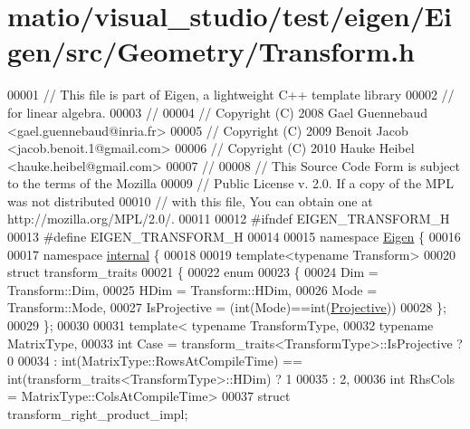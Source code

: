 \hypertarget{matio_2visual__studio_2test_2eigen_2_eigen_2src_2_geometry_2_transform_8h_source}{}\section{matio/visual\+\_\+studio/test/eigen/\+Eigen/src/\+Geometry/\+Transform.h}
\label{matio_2visual__studio_2test_2eigen_2_eigen_2src_2_geometry_2_transform_8h_source}

\begin{DoxyCode}
00001 \textcolor{comment}{// This file is part of Eigen, a lightweight C++ template library}
00002 \textcolor{comment}{// for linear algebra.}
00003 \textcolor{comment}{//}
00004 \textcolor{comment}{// Copyright (C) 2008 Gael Guennebaud <gael.guennebaud@inria.fr>}
00005 \textcolor{comment}{// Copyright (C) 2009 Benoit Jacob <jacob.benoit.1@gmail.com>}
00006 \textcolor{comment}{// Copyright (C) 2010 Hauke Heibel <hauke.heibel@gmail.com>}
00007 \textcolor{comment}{//}
00008 \textcolor{comment}{// This Source Code Form is subject to the terms of the Mozilla}
00009 \textcolor{comment}{// Public License v. 2.0. If a copy of the MPL was not distributed}
00010 \textcolor{comment}{// with this file, You can obtain one at http://mozilla.org/MPL/2.0/.}
00011 
00012 \textcolor{preprocessor}{#ifndef EIGEN\_TRANSFORM\_H}
00013 \textcolor{preprocessor}{#define EIGEN\_TRANSFORM\_H}
00014 
00015 \textcolor{keyword}{namespace }\hyperlink{namespace_eigen}{Eigen} \{ 
00016 
00017 \textcolor{keyword}{namespace }\hyperlink{namespaceinternal}{internal} \{
00018 
00019 \textcolor{keyword}{template}<\textcolor{keyword}{typename} Transform>
00020 \textcolor{keyword}{struct }transform\_traits
00021 \{
00022   \textcolor{keyword}{enum}
00023   \{
00024     Dim = Transform::Dim,
00025     HDim = Transform::HDim,
00026     Mode = Transform::Mode,
00027     IsProjective = (int(Mode)==int(\hyperlink{group__enums_ggaee59a86102f150923b0cac6d4ff05107aead6a2de12a17aaa4f5c523215dfccad}{Projective}))
00028   \};
00029 \};
00030 
00031 \textcolor{keyword}{template}< \textcolor{keyword}{typename} TransformType,
00032           \textcolor{keyword}{typename} MatrixType,
00033           \textcolor{keywordtype}{int} Case = transform\_traits<TransformType>::IsProjective ? 0
00034                    : int(MatrixType::RowsAtCompileTime) == int(transform\_traits<TransformType>::HDim) ? 1
00035                    : 2,
00036           \textcolor{keywordtype}{int} RhsCols = MatrixType::ColsAtCompileTime>
00037 \textcolor{keyword}{struct }transform\_right\_product\_impl;

\end{DoxyCode}
